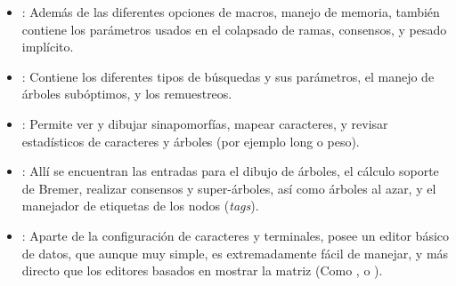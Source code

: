 \begin{itemize}
	\item {}: Adem\'as de las diferentes opciones de macros, manejo de memoria, tambi\'en contiene los par\'ametros usados en el colapsado de ramas, consensos, y pesado impl\'icito.
	\item {}: Contiene los diferentes tipos de b\'usquedas y sus par\'ametros, el manejo de \'arboles sub\'optimos, y los remuestreos.
	\item {}: Permite ver y dibujar sinapomorf\'ias, mapear caracteres, y revisar estad\'isticos de caracteres y \'arboles (por ejemplo long o peso).
	\item{}: All\'i se encuentran las entradas para el dibujo de \'arboles, el c\'alculo soporte de Bremer, realizar consensos y super-\'arboles, as\'i como \'arboles al azar, y el manejador de etiquetas de los nodos (\textit{tags}).
	\item {}: Aparte de la configuraci\'on de caracteres y terminales, posee un editor b\'asico de datos, que aunque muy simple, es extremadamente f\'acil de manejar, y m\'as directo que los editores basados en mostrar la matriz (Como , o ).
\end{itemize}
